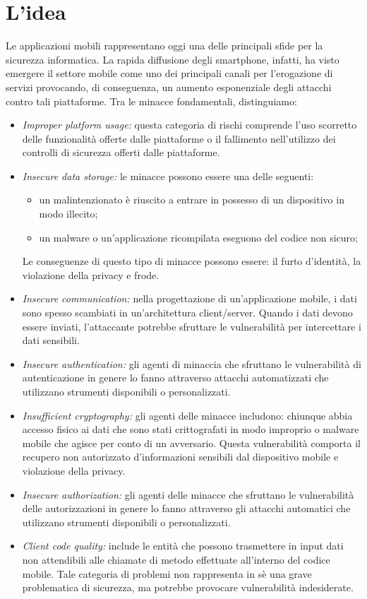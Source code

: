 \section{L'idea}\label{sec:l'idea}
Le applicazioni mobili rappresentano oggi una delle principali sfide per la sicurezza informatica.
La rapida diffusione degli smartphone, infatti, ha visto emergere il settore mobile come uno dei principali canali per l'erogazione di servizi provocando, di conseguenza, un aumento esponenziale degli attacchi contro tali piattaforme.
Tra le minacce\cite{site:owasp} fondamentali, distinguiamo:

\begin{itemize}
    \item \textit{Improper platform usage:} questa categoria di rischi comprende l'uso scorretto delle funzionalità offerte dalle piattaforme o il fallimento nell'utilizzo dei controlli di sicurezza offerti dalle piattaforme.
    \item \textit{Insecure data storage:} le minacce possono essere una delle seguenti:
    \begin{itemize}
        \item un malintenzionato è riuscito a entrare in possesso di un dispositivo in modo illecito;
        \item un malware o un'applicazione ricompilata eseguono del codice non sicuro;
    \end{itemize}
    Le conseguenze di questo tipo di minacce possono essere: il furto d'identità, la violazione della privacy e frode.
    \item \textit{Insecure communication:}
    nella progettazione di un'applicazione mobile, i dati sono spesso scambiati in un'architettura client/server.
    Quando i dati devono essere inviati, l'attaccante potrebbe sfruttare le vulnerabilità per intercettare i dati sensibili.
    \item \textit{Insecure authentication:}
    gli agenti di minaccia che sfruttano le vulnerabilità di autenticazione in genere lo fanno attraverso attacchi automatizzati che utilizzano strumenti disponibili o personalizzati.
    \item \textit{Insufficient cryptography:} gli agenti delle minacce includono: chiunque abbia accesso fisico ai dati che sono stati crittografati in modo improprio o malware mobile che agisce per conto di un avversario.
    Questa vulnerabilità comporta il recupero non autorizzato d'informazioni sensibili dal dispositivo mobile e violazione della privacy.
    \item \textit{Insecure authorization:}
    gli agenti delle minacce che sfruttano le vulnerabilità delle autorizzazioni in genere lo fanno attraverso gli attacchi automatici che utilizzano strumenti disponibili o personalizzati.
    \item \textit{Client code quality:} include le entità che possono trasmettere in input dati non attendibili alle chiamate di metodo effettuate all'interno del codice mobile.
    Tale categoria di problemi non rappresenta in sè una grave problematica di sicurezza, ma potrebbe provocare vulnerabilità indesiderate.


\end{itemize}
